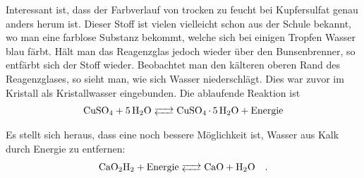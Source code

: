 \documentclass[12pt,a4paper,titlepage,headinclude,bibtotoc]{scrartcl}
\begin{document}
Interessant ist, dass der Farbverlauf von trocken zu feucht bei Kupfersulfat genau anders herum ist.
Dieser Stoff ist vielen vielleicht schon aus der Schule bekannt, wo man eine farblose Substanz bekommt, welche sich bei einigen Tropfen Wasser blau färbt.
Hält man das Reagenzglas jedoch wieder über den Bunsenbrenner, so entfärbt sich der Stoff wieder.
Beobachtet man den kälteren oberen Rand des Reagenzglases, so sieht man, wie sich Wasser niederschlägt.
Dies war zuvor im Kristall als Kristallwasser eingebunden.
Die ablaufende Reaktion ist
\begin{align*}
	\ce{CuSO4 + 5H2O <--> CuSO4 . 5H2O + Energie} 
\end{align*}

Es stellt sich heraus, dass eine noch bessere Möglichkeit ist, Wasser aus Kalk durch Energie zu entfernen:
\begin{align*}
	\ce{CaO2H2 + Energie <--> CaO + H2O}\quad .
\end{align*}
\end{document}
